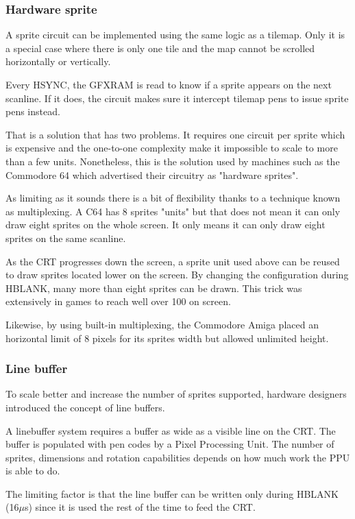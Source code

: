 \subsubsection{Hardware sprite}
A sprite circuit can be implemented using the same logic as a tilemap. Only it is a special case where there is only one tile and the map cannot be scrolled horizontally or vertically.

Every HSYNC, the GFXRAM is read to know if a sprite appears on the next scanline. If it does, the circuit makes sure it intercept tilemap pens to issue sprite pens instead. 

That is a solution that has two problems. It requires one circuit per sprite which is expensive and the one-to-one complexity make it impossible to scale to more than a few units. Nonetheless, this is the solution used by machines such as the Commodore 64 which advertised their circuitry as "hardware sprites".


As limiting as it sounds there is a bit of flexibility thanks to a technique known as multiplexing. A C64 has 8 sprites "units" but that does not mean it can only draw eight sprites on the whole screen. It only means it can only draw eight sprites on the same scanline.

As the CRT progresses down the screen, a sprite unit used above can be reused to draw sprites located lower on the screen. By changing the configuration during HBLANK, many more than eight sprites can be drawn. This trick was extensively in games to reach well over 100 on screen.


Likewise, by using built-in multiplexing, the Commodore Amiga placed an horizontal limit of 8 pixels for its sprites width but allowed unlimited height.

\subsubsection{Line buffer}
To scale better and increase the number of sprites supported, hardware designers introduced the concept of line buffers. 

A linebuffer system requires a buffer as wide as a visible line on the CRT. The buffer is populated with pen codes by a Pixel Processing Unit. The number of sprites, dimensions and rotation capabilities depends on how much work the PPU is able to do. 

The limiting factor is that the line buffer can be written only during HBLANK (16$\mu$s) since it is used the rest of the time to feed the CRT.

